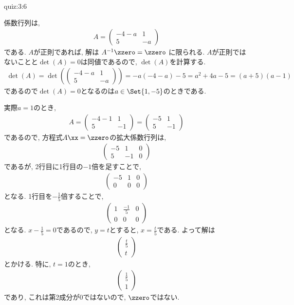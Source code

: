 \begin{answerof}{quiz:3:6}
  
  係数行列は,
  \begin{align*}
    A=    \begin{pmatrix}-4-a&1\\5&-a\end{pmatrix}
  \end{align*}
  である.
  $A$が正則であれば,
  解は
  $A^{-1}\zzero=\zzero$
  に限られる.
  $A$が正則ではないことと$\det(A)=0$は同値であるので,
  $\det(A)$を計算する.
  \begin{align*}
    \det(A)=\det(\begin{pmatrix}-4-a&1\\5&-a\end{pmatrix})
     =-a(-4-a)-5=a^2+4a-5=(a+5)(a-1)
  \end{align*}
  であるので$\det(A)=0$となるのは$a\in\Set{1,-5}$のときである.

  実際$a=1$のとき,
  \begin{align*}
    A=\begin{pmatrix}-4-1&1\\5&-1\end{pmatrix}
    =\begin{pmatrix}-5&1\\5&-1\end{pmatrix}
  \end{align*}
  であるので, 方程式$A\xx=\zzero$の拡大係数行列は,
  \begin{align*}
    \begin{pmatrix}-5&1&0\\5&-1&0\end{pmatrix}
  \end{align*}
  であるが, 2行目に1行目の$-1$倍を足すことで,
  \begin{align*}
    \begin{pmatrix}-5&1&0\\0&0&0\end{pmatrix}
  \end{align*}
  となる. 1行目を$-\frac{1}{5}$倍することで,
  \begin{align*}
    \begin{pmatrix}1&\frac{-1}{5}&0\\0&0&0\end{pmatrix}
  \end{align*}
  となる.  $x-\frac{1}{5}=0$であるので, $y=t$とすると, $x=\frac{t}{5}$である.
  よって解は
  \begin{align*}
    \begin{pmatrix}\frac{t}{5}\\t\end{pmatrix}
  \end{align*}
  とかける. 特に, $t=1$のとき,
  \begin{align*}
    \begin{pmatrix}\frac{1}{5}\\1\end{pmatrix}
  \end{align*}
  であり, これは第2成分が$0$ではないので, $\zzero$ではない.


\end{answerof}
